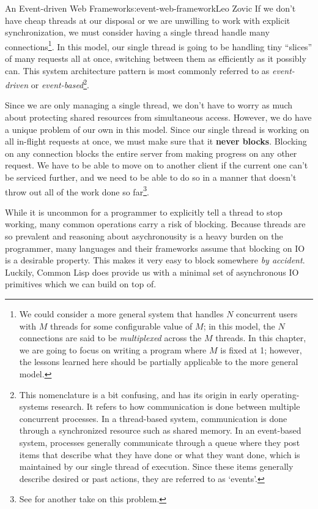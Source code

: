 \begin{aosachapter}{An Event-driven Web Framework}{s:event-web-framework}{Leo Zovic}
If we don't have cheap threads at our disposal or we are unwilling to
work with explicit synchronization, we must consider having a single
thread handle many connections\footnote{We could consider a more general
  system that handles $N$ concurrent users with $M$ threads for some
  configurable value of $M$; in this model, the $N$ connections are said
  to be \emph{multiplexed} across the $M$ threads. In this chapter, we
  are going to focus on writing a program where $M$ is fixed at 1;
  however, the lessons learned here should be partially applicable to
  the more general model.}. In this model, our single thread is going to
be handling tiny ``slices'' of many requests all at once, switching
between them as efficiently as it possibly can. This system architecture
pattern is most commonly referred to as \emph{event-driven} or
\emph{event-based}\footnote{This nomenclature is a bit confusing, and
  has its origin in early operating-systems research. It refers to how
  communication is done between multiple concurrent processes. In a
  thread-based system, communication is done through a synchronized
  resource such as shared memory. In an event-based system, processes
  generally communicate through a queue where they post items that
  describe what they have done or what they want done, which is
  maintained by our single thread of execution. Since these items
  generally describe desired or past actions, they are referred to as
  `events'.}.

Since we are only managing a single thread, we don't have to worry as
much about protecting shared resources from simultaneous access.
However, we do have a unique problem of our own in this model. Since our
single thread is working on all in-flight requests at once, we must make
sure that it \textbf{never blocks}. Blocking on any connection blocks
the entire server from making progress on any other request. We have to
be able to move on to another client if the current one can't be
serviced further, and we need to be able to do so in a manner that
doesn't throw out all of the work done so far\footnote{See
   for another take on this problem.}.

While it is uncommon for a programmer to explicitly tell a thread to
stop working, many common operations carry a risk of blocking. Because
threads are so prevalent and reasoning about asychronousity is a heavy
burden on the programmer, many languages and their frameworks assume
that blocking on IO is a desirable property. This makes it very easy to
block somewhere \emph{by accident}. Luckily, Common Lisp does provide us
with a minimal set of asynchronous IO primitives which we can build on
top of.


\end{aosachapter}
